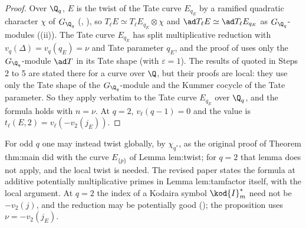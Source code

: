 \begin{proof}
Over $\Q_q$, $E$ is the twist of the Tate curve $E_{q_E}$ by a ramified quadratic character $\chi$ of $G_{\Q_q}$ (, ), so $T_\ell E\simeq T_\ell E_{q_E}\otimes\chi$
and $\ad T_\ell E\simeq\ad T_\ell E_{q_E}$ as $G_{\Q_q}$-modules ((ii)). The Tate curve $E_{q_E}$ has split multiplicative reduction with
$v_q(\Delta)=v_q(q_E)=\nu$ and Tate parameter $q_E$, and the proof of  uses only the $G_{\Q_q}$-module $\ad T$ in its Tate shape (with $\varepsilon=1$). The
results of  quoted in Steps 2 to 5 are stated there for a curve over $\Q$, but their proofs are local: they use only the Tate shape of the
$G_{\Q_q}$-module and the Kummer cocycle of the Tate parameter. So they apply verbatim to the Tate curve $E_{q_E}$ over $\Q_q$, and the formula holds with $n=\nu$. At $q=2$, $v_\ell(q-1)=0$ and the value is $t_\ell(E,2)=v_\ell(-v_2(j_E))$.
\end{proof}

For odd $q$ one may instead twist globally, by $\chi_{q^*}$, as the original proof of Theorem thm:main did with the curve $E_{\{p\}}$ of Lemma lem:twist; for $q=2$ that lemma
does not apply, and the local twist is needed. The revised paper states the formula at additive potentially multiplicative primes in Lemma lem:tamfactor itself,
with the local argument. At $q=2$ the index of a Kodaira symbol $\kod{I}_m^*$ need not be $-v_2(j)$, and the reduction may be potentially good (); the
proposition uses $\nu=-v_2(j_E)$.

